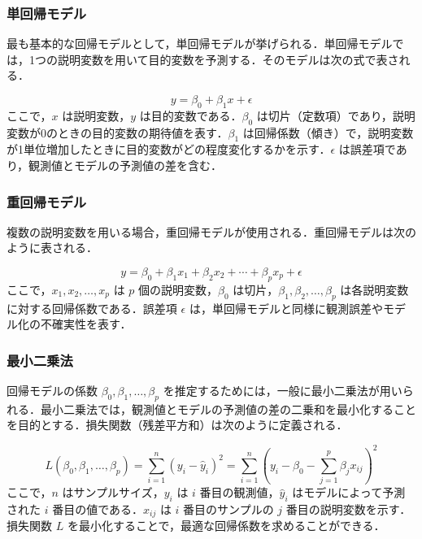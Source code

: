 \subsubsection*{単回帰モデル}
最も基本的な回帰モデルとして，単回帰モデルが挙げられる．単回帰モデルでは，1つの説明変数を用いて目的変数を予測する\cite{prml}．そのモデルは次の式で表される．

\begin{equation}
	y = \beta_0 + \beta_1 x + \epsilon
\end{equation}
ここで，$x$ は説明変数，$y$ は目的変数である．$\beta_0$ は切片（定数項）であり，説明変数が0のときの目的変数の期待値を表す．$\beta_1$ は回帰係数（傾き）で，説明変数が1単位増加したときに目的変数がどの程度変化するかを示す．$\epsilon$ は誤差項であり，観測値とモデルの予測値の差を含む．

\subsubsection*{重回帰モデル}
複数の説明変数を用いる場合，重回帰モデルが使用される\cite{prml}．重回帰モデルは次のように表される．

\begin{equation}
	y = \beta_0 + \beta_1 x_1 + \beta_2 x_2 + \cdots + \beta_p x_p + \epsilon
\end{equation}
ここで，$x_1, x_2, \ldots, x_p$ は $p$ 個の説明変数，$\beta_0$ は切片，$\beta_1, \beta_2, \ldots, \beta_p$ は各説明変数に対する回帰係数である．誤差項 $\epsilon$ は，単回帰モデルと同様に観測誤差やモデル化の不確実性を表す．

\subsubsection*{最小二乗法}
回帰モデルの係数 $\beta_0, \beta_1, \ldots, \beta_p$ を推定するためには，一般に最小二乗法が用いられる\cite{prml}．最小二乗法では，観測値とモデルの予測値の差の二乗和を最小化することを目的とする．損失関数（残差平方和）は次のように定義される．

\begin{equation}
	L(\beta_0, \beta_1, \ldots, \beta_p) = \sum_{i=1}^{n} (y_i - \hat{y}_i)^2 = \sum_{i=1}^{n} (y_i - \beta_0 - \sum_{j=1}^{p} \beta_j x_{ij})^2
\end{equation}
ここで，$n$ はサンプルサイズ，$y_i$ は $i$ 番目の観測値，$\hat{y}_i$ はモデルによって予測された $i$ 番目の値である．$x_{ij}$ は $i$ 番目のサンプルの $j$ 番目の説明変数を示す．損失関数 $L$ を最小化することで，最適な回帰係数を求めることができる．

